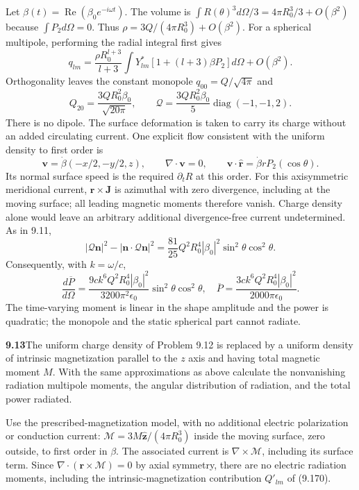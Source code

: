 Let $\beta(t)=\operatorname{Re}(\beta_0e^{-i\omega t})$.
The volume is
$\int R(\theta)^3d\Omega/3=4\pi R_0^3/3+O(\beta^2)$ because
$\int P_2d\Omega=0$. Thus $\rho=3Q/(4\pi R_0^3)+O(\beta^2)$.
For a spherical multipole, performing the radial integral first gives
\[
q_{lm}=\frac{\rho R_0^{l+3}}{l+3}
\int Y_{lm}^*[1+(l+3)\beta P_2]d\Omega+O(\beta^2).
\]
Orthogonality leaves the constant monopole $q_{00}=Q/\sqrt{4\pi}$ and
\[
\boxed{Q_{20}=\frac{3QR_0^2\beta_0}{\sqrt{20\pi}},\qquad
\mathcal Q=\frac{3QR_0^2\beta_0}{5}\operatorname{diag}(-1,-1,2).}
\]
There is no dipole. The surface deformation is taken to carry its charge
without an added circulating current. One explicit flow consistent with
the uniform density to first order is
\[
\mathbf v=\dot\beta(-x/2,-y/2,z),\qquad
\nabla\cdot\mathbf v=0,\qquad
\mathbf v\cdot\hat{\mathbf r}=\dot\beta rP_2(\cos\theta).
\]
Its normal surface speed is the required $\partial_tR$ at this order.
For this axisymmetric meridional current, $\mathbf r\times\mathbf J$
is azimuthal with zero divergence, including at the moving surface;
all leading magnetic moments therefore vanish. Charge density alone
would leave an arbitrary additional divergence-free current undetermined.
As in 9.11,
\[
|\mathcal Q\mathbf n|^2-|\mathbf n\cdot\mathcal Q\mathbf n|^2
=\frac{81}{25}Q^2R_0^4|\beta_0|^2\sin^2\theta\cos^2\theta.
\]
Consequently, with $k=\omega/c$,
\[
\boxed{\frac{d\overline P}{d\Omega}
=\frac{9ck^6Q^2R_0^4|\beta_0|^2}{3200\pi^2\epsilon_0}
\sin^2\theta\cos^2\theta,\quad
\overline P=\frac{3ck^6Q^2R_0^4|\beta_0|^2}{2000\pi\epsilon_0}.}
\]
The time-varying moment is linear in the shape amplitude and the power
is quadratic; the monopole and the static spherical part cannot radiate.

\par\bigskip
\noindent\textbf{9.13}\quad The uniform charge density of Problem 9.12 is replaced by a uniform density of intrinsic magnetization parallel to the $z$ axis and having total magnetic moment $M$. With the same approximations as above calculate the nonvanishing radiation multipole moments, the angular distribution of radiation, and the total power radiated. 
\solution

Use the prescribed-magnetization model, with no additional electric
polarization or conduction current:
$\boldsymbol{\mathcal M}=3M\hat{\mathbf z}/(4\pi R_0^3)$ inside the
moving surface, zero outside, to first order in $\beta$.
The associated current is $\nabla\times\boldsymbol{\mathcal M}$,
including its surface term. Since
$\nabla\cdot(\mathbf r\times\boldsymbol{\mathcal M})=0$ by axial
symmetry, there are no electric radiation moments, including the
intrinsic-magnetization contribution $Q'_{lm}$ of (9.170).

